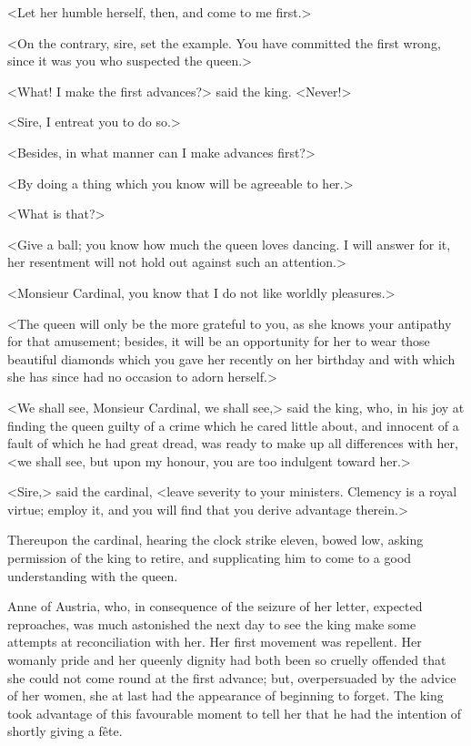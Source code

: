 <Let her humble herself, then, and come to me first.> 

<On the contrary, sire, set the example. You have committed the first wrong, since it was you who suspected the queen.> 

<What! I make the first advances?> said the king. <Never!> 

<Sire, I entreat you to do so.> 

<Besides, in what manner can I make advances first?> 

<By doing a thing which you know will be agreeable to her.> 

<What is that?> 

<Give a ball; you know how much the queen loves dancing. I will answer for it, her resentment will not hold out against such an attention.> 

<Monsieur Cardinal, you know that I do not like worldly pleasures.> 

<The queen will only be the more grateful to you, as she knows your antipathy for that amusement; besides, it will be an opportunity for her to wear those beautiful diamonds which you gave her recently on her birthday and with which she has since had no occasion to adorn herself.> 

<We shall see, Monsieur Cardinal, we shall see,> said the king, who, in his joy at finding the queen guilty of a crime which he cared little about, and innocent of a fault of which he had great dread, was ready to make up all differences with her, <we shall see, but upon my honour, you are too indulgent toward her.> 

<Sire,> said the cardinal, <leave severity to your ministers. Clemency is a royal virtue; employ it, and you will find that you derive advantage therein.> 

Thereupon the cardinal, hearing the clock strike eleven, bowed low, asking permission of the king to retire, and supplicating him to come to a good understanding with the queen. 

Anne of Austria, who, in consequence of the seizure of her letter, expected reproaches, was much astonished the next day to see the king make some attempts at reconciliation with her. Her first movement was repellent. Her womanly pride and her queenly dignity had both been so cruelly offended that she could not come round at the first advance; but, overpersuaded by the advice of her women, she at last had the appearance of beginning to forget. The king took advantage of this favourable moment to tell her that he had the intention of shortly giving a fête. 

